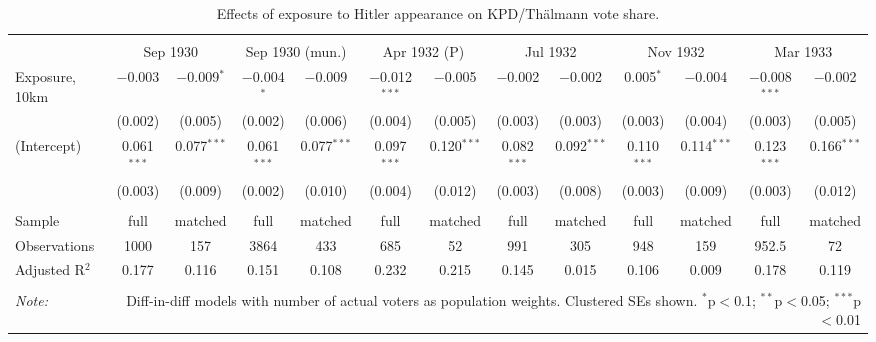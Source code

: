
\begin{table}[!htbp] \centering 
  \caption{Effects of exposure to Hitler appearance on KPD/Thälmann vote share.\vspace{-.25cm}} 
  \label{tab:nsdap-voteshare-kpd-dd} 
\scriptsize 
\begin{tabular}{@{\extracolsep{5pt}}lcccccccccccc} 
\\[-1.8ex]\hline 
\hline \\[-1.8ex] 
 & \multicolumn{2}{c}{Sep 1930} & \multicolumn{2}{c}{Sep 1930 (mun.)} & \multicolumn{2}{c}{Apr 1932 (P)} & \multicolumn{2}{c}{Jul 1932} & \multicolumn{2}{c}{Nov 1932} & \multicolumn{2}{c}{Mar 1933} \\ 
 \cmidrule(r){2-3}\cmidrule(r){4-5}\cmidrule(r){6-7}\cmidrule(r){8-9}\cmidrule(r){10-11}\cmidrule(r){12-13}Exposure, 10km & $-$0.003 & $-$0.009$^{*}$ & $-$0.004$^{*}$ & $-$0.009 & $-$0.012$^{***}$ & $-$0.005 & $-$0.002 & $-$0.002 & 0.005$^{*}$ & $-$0.004 & $-$0.008$^{***}$ & $-$0.002 \\ 
  & (0.002) & (0.005) & (0.002) & (0.006) & (0.004) & (0.005) & (0.003) & (0.003) & (0.003) & (0.004) & (0.003) & (0.005) \\ 
  (Intercept) & 0.061$^{***}$ & 0.077$^{***}$ & 0.061$^{***}$ & 0.077$^{***}$ & 0.097$^{***}$ & 0.120$^{***}$ & 0.082$^{***}$ & 0.092$^{***}$ & 0.110$^{***}$ & 0.114$^{***}$ & 0.123$^{***}$ & 0.166$^{***}$ \\ 
  & (0.003) & (0.009) & (0.002) & (0.010) & (0.004) & (0.012) & (0.003) & (0.008) & (0.003) & (0.009) & (0.003) & (0.012) \\ 
 \hline \\[-1.8ex] 
Sample & full & matched & full & matched & full & matched & full & matched & full & matched & full & matched \\ 
Observations & 1000 & 157 & 3864 & 433 & 685 & 52 & 991 & 305 & 948 & 159 & 952.5 & 72 \\ 
Adjusted R$^{2}$ & 0.177 & 0.116 & 0.151 & 0.108 & 0.232 & 0.215 & 0.145 & 0.015 & 0.106 & 0.009 & 0.178 & 0.119 \\ 
\hline 
\hline \\[-1.8ex] 
\textit{Note:}  & \multicolumn{12}{r}{Diff-in-diff models with number of actual voters as population weights. Clustered SEs shown. $^{*}$p$<$0.1; $^{**}$p$<$0.05; $^{***}$p$<$0.01} \\ 
\end{tabular} 
\end{table} 
